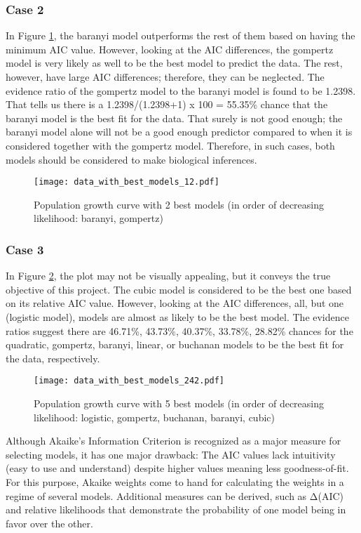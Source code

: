 \documentclass[11pt]{article}
\begin{document}
\begin{linenumbers}
	\subsubsection{Case 2}
	In Figure \ref{tab:figure_12}, the baranyi model outperforms the rest of them based on having the minimum AIC value. However, looking at the AIC differences, the gompertz model is very likely as well to be the best model to predict the data. The rest, however, have large AIC differences; therefore, they can be neglected. The evidence ratio of the gompertz model to the baranyi model is found to be 1.2398. That tells us there is a 1.2398/(1.2398+1) x 100 = 55.35\% chance that the baranyi model is the best fit for the data. That surely is not good enough; the baranyi model alone will not be a good enough predictor compared to when it is considered together with the gompertz model. Therefore, in such cases, both models should be considered to make biological inferences.
	
	\begin{figure}
		\centering
		\texttt{[image: data\_with\_best\_models\_12.pdf]}
		\caption{Population growth curve with 2 best models (in order of decreasing likelihood: baranyi, gompertz)}
		\label{tab:figure_12}
	\end{figure}

	\subsubsection{Case 3}
	In Figure \ref{tab:figure_242}, the plot may not be visually appealing, but it conveys the true objective of this project. The cubic model is considered to be the best one based on its relative AIC value. However, looking at the AIC differences, all, but one (logistic model), models are almost as likely to be the best model. The evidence ratios suggest there are 46.71\%, 43.73\%, 40.37\%, 33.78\%, 28.82\% chances for the quadratic, gompertz, baranyi, linear, or buchanan models to be the best fit for the data, respectively.

	\begin{figure}
		\centering
		\texttt{[image: data\_with\_best\_models\_242.pdf]}
		\caption{Population growth curve with 5 best models (in order of decreasing likelihood: logistic, gompertz, buchanan, baranyi, cubic)}
		\label{tab:figure_242}
	\end{figure}

	Although Akaike's Information Criterion is recognized as a major measure for selecting models, it has one major drawback: The AIC values lack intuitivity (easy to use and understand) despite higher values meaning less goodness-of-fit. For this purpose, Akaike weights come to hand for calculating the weights in a regime of several models. Additional measures can be derived, such as Δ(AIC) and relative likelihoods that demonstrate the probability of one model being in favor over the other.\\
	

\end{linenumbers}
\end{document}

